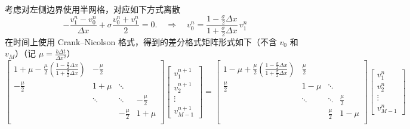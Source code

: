 考虑对左侧边界使用半网格，对应如下方式离散
\[
    - \frac{v_1^n - v_{0}^n}{\Delta x} + \sigma \frac{v_0^n + v_1^n}2 = 0.\quad\Rightarrow\quad v_0^{n} = \frac{1-\frac{\sigma}2 \Delta x}{1 +\frac{\sigma}2 \Delta x}\, v_1^{n}
\]
在时间上使用 Crank–Nicolson 格式，得到的差分格式矩阵形式如下（不含 $v_0$ 和 $v_{M}$）（记 $\mu = \frac{b \Delta t}{\Delta x^2}$）
{\small\[
    \begin{bmatrix}
        1+\mu - \frac{\mu}{2}\left(\frac{1-\frac{\sigma}2 \Delta x}{1 +\frac{\sigma}2 \Delta x}\right) & -\frac{\mu}2 &              &              \\
        -\frac{\mu}2                                                                                   & 1+\mu        & \ddots       &              \\
                                                                                                       & \ddots       & \ddots       & -\frac{\mu}2 \\
                                                                                                       &              & -\frac{\mu}2 & 1+\mu        \\
    \end{bmatrix}
    \begin{bmatrix}
        v_1^{n+1} \\ v_2^{n+1} \\ \vdots  \\ v_{M-1}^{n+1}
    \end{bmatrix}
    =
    \begin{bmatrix}
        1 -\mu + \frac{\mu}{2}\left(\frac{1-\frac{\sigma}2 \Delta x}{1 +\frac{\sigma}2 \Delta x}\right) & \frac{\mu}2 &             &             \\
        \frac{\mu}2                                                                                     & 1-\mu       & \ddots      &             \\
                                                                                                        & \ddots      & \ddots      & \frac{\mu}2 \\
                                                                                                        &             & \frac{\mu}2 & 1-\mu       \\
    \end{bmatrix}
    \begin{bmatrix}
        v_1^{n} \\ v_2^{n} \\ \vdots  \\ v_{M-1}^{n}
    \end{bmatrix}
\]}

